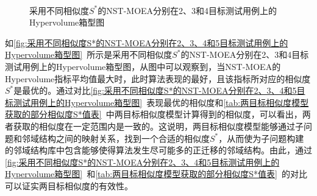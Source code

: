 \par
\begin{figure}[!h]
     \quad
    \\
     \quad
    \caption[采用不同相似度$S^*$的NST-MOEA分别在2、3、4和5目标测试用例上的Hypervolume箱型图]{采用不同相似度$S^*$的NST-MOEA分别在2、3和4目标测试用例上的Hypervolume箱型图}
    \label{fig:采用不同相似度S*的NST-MOEA分别在2、3、4和5目标测试用例上的Hypervolume箱型图}
\end{figure}
如\autoref{fig:采用不同相似度S*的NST-MOEA分别在2、3、4和5目标测试用例上的Hypervolume箱型图}~所示是采用不同相似度$S^*$的NST-MOEA分别在2、3和4目标测试用例上的Hypervolume箱型图，从图中可以观察到，当NST-MOEA的Hypervolume指标平均值最大时，此时算法表现的最好，且该指标所对应的相似度$S^*$是最优的。通过对比\autoref{fig:采用不同相似度S*的NST-MOEA分别在2、3、4和5目标测试用例上的Hypervolume箱型图}~表现最优的相似度和\autoref{tab:两目标相似度模型获取的部分相似度S*值表}~中两目标相似度模型计算得到的相似度，可以看出，两者获取的相似度在一定范围内是一致的。这说明，两目标相似度模型能够通过子问题和邻域结构之间的映射关系，找到一个合适的相似度$S^*$，从而使为子问题构建的邻域结构库中包含能够使得算法发生尽可能多的正迁移的邻域结构。由此，通过\autoref{fig:采用不同相似度S*的NST-MOEA分别在2、3、4和5目标测试用例上的Hypervolume箱型图}~和\autoref{tab:两目标相似度模型获取的部分相似度S*值表}~的对比可以证实两目标相似度的有效性。

